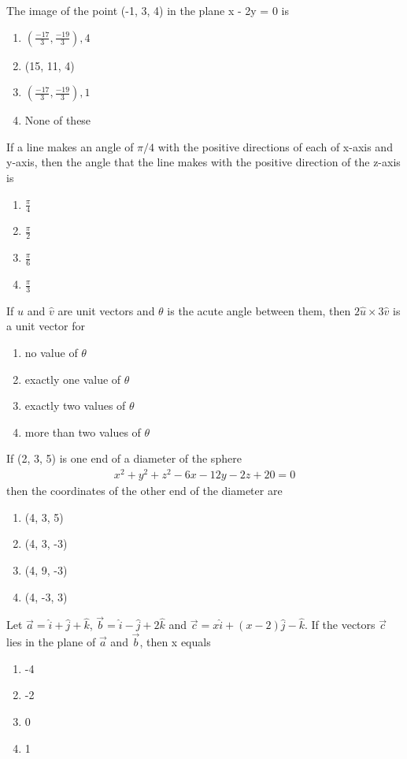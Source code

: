 \item The image of the point (-1, 3, 4) in the plane x - 2y = 0 is
\begin{enumerate}
\item $(\frac{-17}{3}, \frac{-19}{3}), 4$
\item (15, 11, 4)
\item $(\frac{-17}{3}, \frac{-19}{3}), 1$
\item None of these
\end{enumerate}

\item If a line makes an angle of $\pi/4$ with the positive directions of each of x-axis and y-axis, then the angle that the line makes with the positive direction of the z-axis is
\begin{enumerate}
\item $\frac{\pi}{4}$
\item $\frac{\pi}{2}$
\item $\frac{\pi}{6}$
\item $\frac{\pi}{3}$
\end{enumerate}

\item If $\hat{u}$ and $\hat{v}$ are unit vectors and $\theta$ is the acute angle between them, then $2\hat{u} \times 3\hat{v}$ is a unit vector for
\begin{enumerate}
\item no value of $\theta$
\item exactly one value of $\theta$
\item exactly two values of $\theta$
\item more than two values of $\theta$
\end{enumerate}

\item If (2, 3, 5) is one end of a diameter of the sphere
\begin{align}
x^2 + y^2 + z^2 - 6x - 12y - 2z + 20 = 0
\end{align}
then the coordinates of the other end of the diameter are
\begin{enumerate}
\item (4, 3, 5)
\item (4, 3, -3)
\item (4, 9, -3)
\item (4, -3, 3)
\end{enumerate}

\item Let $\overrightarrow{a} = \hat{i} + \hat{j} + \hat{k}$, $\overrightarrow{b} = \hat{i} - \hat{j} + 2\hat{k}$ and 
$\overrightarrow{c} = x\hat{i} + (x - 2)\hat{j} - \hat{k}$. If the vectors $\overrightarrow{c}$ lies in the plane of 
$\overrightarrow{a}$ and $\overrightarrow{b}$, then x equals
\begin{enumerate}
\item -4
\item -2
\item 0
\item 1
\end{enumerate}

